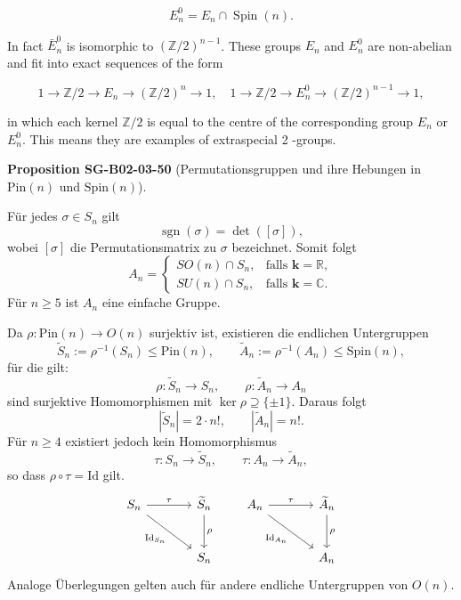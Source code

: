\documentclass[10pt, letterpaper]{article}
\newcommand{\sgn}{\operatorname{sgn}}
\newcommand{\Spin}{\mathrm{Spin}}
\newcommand{\Pin}{\mathrm{Pin}}
\newcommand{\CustomHeading}[3]{%
  \par\medskip\noindent%
  \textbf{#1 #2} \textnormal{(#3)}.\enskip%
}
\newenvironment{PROP}[2]{\begin{unitbox}\CustomHeading{Proposition}{#1}{#2}}{\end{unitbox}}
\begin{document}
$$
E_{n}^{0}=E_{n} \cap \operatorname{Spin}(n) .
$$

In fact $\bar{E}_{n}^{0}$ is isomorphic to $(\mathbb{Z} / 2)^{n-1}$. These groups $E_{n}$ and $E_{n}^{0}$ are non-abelian and fit into exact sequences of the form

$$
1 \rightarrow \mathbb{Z} / 2 \longrightarrow E_{n} \longrightarrow(\mathbb{Z} / 2)^{n} \rightarrow 1, \quad 1 \rightarrow \mathbb{Z} / 2 \longrightarrow E_{n}^{0} \longrightarrow(\mathbb{Z} / 2)^{n-1} \rightarrow 1,
$$

in which each kernel $\mathbb{Z} / 2$ is equal to the centre of the corresponding group $E_{n}$ or $E_{n}^{0}$. This means they are examples of extraspecial 2 -groups.


\begin{PROP}{SG-B02-03-50}{Permutationsgruppen und ihre Hebungen in $\Pin(n)$ und $\Spin(n)$}
Für jedes $\sigma\in S_n$ gilt
\[
\sgn(\sigma)=\det([\sigma]),
\]
wobei $[\sigma]$ die Permutationsmatrix zu $\sigma$ bezeichnet. Somit folgt
\[
A_n=
\begin{cases}
SO(n)\cap S_n, & \text{falls }\mathbf{k}=\mathbb{R},\\[2mm]
SU(n)\cap S_n, & \text{falls }\mathbf{k}=\mathbb{C}.
\end{cases}
\]
Für $n\ge 5$ ist $A_n$ eine einfache Gruppe.

Da $\rho:\Pin(n)\to O(n)$ surjektiv ist, existieren die endlichen Untergruppen
\[
\widetilde S_n := \rho^{-1}(S_n)\le \Pin(n),
\qquad
\widetilde A_n := \rho^{-1}(A_n)\le \Spin(n),
\]
für die gilt:
\[
\rho:\widetilde S_n\to S_n,\qquad \rho:\widetilde A_n\to A_n
\]
sind surjektive Homomorphismen mit $\ker\rho\supseteq\{\pm1\}$.
Daraus folgt
\[
|\widetilde S_n|=2\cdot n!,\qquad |\widetilde A_n|=n!.
\]
Für $n\ge 4$ existiert jedoch kein Homomorphismus
\[
\tau:S_n\to \widetilde S_n,\qquad
\tau:A_n\to \widetilde A_n,
\]
so dass $\rho\circ\tau=\mathrm{Id}$ gilt.
\[
\begin{tikzcd}[row sep=large, column sep=large]
S_n \arrow[r,"\tau"] \arrow[dr, "\mathrm{Id}_{S_n}"'] & \widetilde S_n \arrow[d,"\rho"]\\
& S_n
\end{tikzcd}
\qquad
\begin{tikzcd}[row sep=large, column sep=large]
A_n \arrow[r,"\tau"] \arrow[dr, "\mathrm{Id}_{A_n}"'] & \widetilde A_n \arrow[d,"\rho"]\\
& A_n
\end{tikzcd}
\]
Analoge Überlegungen gelten auch für andere endliche Untergruppen von $O(n)$.
\end{PROP}
\end{document}
